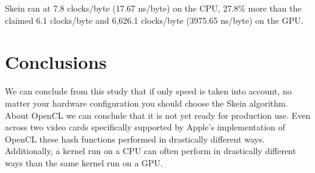 \documentclass{article}
\begin{document}
Skein ran at 7.8 clocks/byte (17.67 ns/byte) on the CPU, 27.8\% more than the claimed 6.1 clocks/byte and 6,626.1 clocks/byte (3975.65 ns/byte) on the GPU.

\section*{Conclusions}

We can conclude from this study that if only speed is taken into account, no matter your hardware configuration you should choose the Skein algorithm.
About OpenCL we can conclude that it is not yet ready for production use.
Even across two video cards specifically supported by Apple's implementation of OpenCL these hash functions performed in drastically different ways.
Additionally, a kernel run on a CPU can often perform in drastically different ways than the same kernel run on a GPU.
\end{document}
